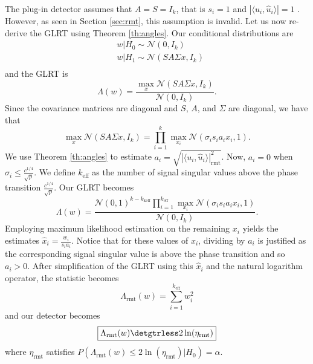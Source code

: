 The plug-in detector assumes that $A=S=I_k$, that is $s_i=1$ and $|\langle u_i,\widehat{u}_i\rangle|=1$ . However, as seen in Section \ref{sec:rmt}, this assumption is invalid. Let us now re-derive the GLRT using Theorem \ref{th:angles}. Our conditional distributions are
\begin{equation*}
\begin{aligned}
&w|H_0\sim\mathcal{N}(0,I_{k})\\
&w|H_1\sim\mathcal{N}(SA\Sigma x, I_{k})\\
\end{aligned}
\end{equation*}
and the GLRT is
\begin{equation*}
\Lambda(w)=\frac{\max_x\mathcal{N}(SA\Sigma x,I_{k})}{\mathcal{N}(0,I_{k})}.
\end{equation*}
Since the covariance matrices are diagonal and $S$, $A$, and $\Sigma$ are diagonal, we have that
\begin{equation*}
\max_x\mathcal{N}(SA\Sigma x,I_{k})=\prod_{i=1}^k\max_{x_i}\mathcal{N}(\sigma_is_ia_ix_i,1).
\end{equation*}
We use Theorem \ref{th:angles} to estimate $a_i=\sqrt{|\langle u_i,\widehat{u}_i\rangle|^2_{\text{rmt}}}$. Now, $a_i=0$ when $\sigma_i\leq \frac{c^{1/4}}{\sqrt{p}}$. We define $k_\text{eff}$ as the number of signal singular values above the phase transition $\frac{c^{1/4}}{\sqrt{p}}$. Our GLRT becomes
\begin{equation*}
\Lambda(w)=\frac{\mathcal{N}(0,1)^{k-k_\text{keff}}\prod_{i=1}^{k_\text{eff}}\max_{x_i}\mathcal{N}(\sigma_is_ia_ix_i,1)}{\mathcal{N}(0,I_{k})}.
\end{equation*}
Employing maximum likelihood estimation on the remaining $x_i$ yields the estimates $\widehat{x}_i=\frac{w_i}{s_ia_i}$. Notice that for these values of $x_i$, dividing by $a_i$ is justified as the corresponding signal singular value is above the phase transition and so $a_i>0$. After simplification of the GLRT using this $\widehat{x}_i$ and the natural logarithm operator, the statistic becomes
\begin{equation}\label{eq:opt stat}
\boxed{\Lambda_{\text{rmt}}(w) = \sum_{i=1}^{k_\text{eff}}w_i^2}
\end{equation}
and our detector becomes
\begin{equation}\label{eq:opt classifier}
\boxed{\Lambda_{\text{rmt}}(w) \detgtrless 2\ln(\eta_{\text{rmt}})}
\end{equation}
where $\eta_{\text{rmt}}$ satisfies $P(\Lambda_{\text{rmt}}(w)\leq2\ln\left(\eta_{\text{rmt}}\right)|H_0)=\alpha$.

